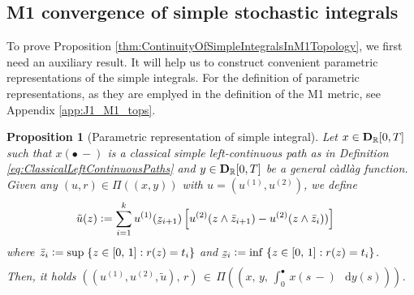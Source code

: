 \documentclass[11pt]{article}
\newtheorem{prop}[theorem]{Proposition}
\theoremstyle{definition}\newtheorem{example}[theorem]{Example}
\theoremstyle{definition}\newtheorem{counterexample}[theorem]{Counterexample}
\theoremstyle{definition}\newtheorem{remark}[theorem]{Remark}
\theoremstyle{definition}\newtheorem{defi}[theorem]{Definition}
\numberwithin{equation}{section}
\newcommand{\ubar}[1]{\underaccent{\bar}{#1}}
\newcommand{\R}{\mathbb{R}}
\newcommand{\D}{{\bf D}}											%
\newcommand*\diff{\mathop{}\!\mathrm{d}}								%
\renewcommand{\sup}[1]{\underset{#1}{\operatorname{sup}}\;}					%
\renewcommand{\inf}[1]{\underset{#1}{\operatorname{inf}}\;}					%
\renewcommand{\|}{\; : \, \;}											%
\begin{document}
\subsection{M1 convergence of simple stochastic integrals}\label{sec:6.5}


To prove Proposition \ref{thm:ContinuityOfSimpleIntegralsInM1Topology}, we first need an auxiliary result. It will help us to construct convenient parametric representations of the simple integrals. For the definition of parametric representations, as they are emplyed in the definition of the M1 metric, see Appendix \ref{app:J1_M1_tops}.

\begin{prop}[Parametric representation of simple integral] \label{prop:ParameterisationOfSimpleIntegrals} 
	Let $x \in \D_\R[0,T]$ such that $x(\bullet \,-)$ is a classical simple left-continuous path as in Definition \ref{eq:ClassicalLeftContinuousPaths} and $y \in \D_\R[0,T]$ be a general càdlàg function. Given any $(u,r) \in \Pi\left((x,y)\right)$ with $u=(u^{(1)}, u^{(2)})$, we define 
	\begin{align*}
		\tilde{u}(z) &\vcentcolon= \sum_{i=1}^k u^{(1)}(\ubar{z}_{i+1})  \left[u^{(2)}(z \wedge \bar{z}_{i+1}) - u^{(2)}(z \wedge \bar{z}_{i}))\right]
	\end{align*}
	where $\bar{z}_i \vcentcolon= \sup{} \{z \in [0,\,1] : r(z) = t_i\}$ and $\ubar{z}_i \vcentcolon= \inf{} \{z \in [0,\,1] : r(z) = t_i\}$.\\
	Then, it holds $\left((u^{(1)},u^{(2)}, \tilde{u}),\, r\right) \, \in \, \Pi\left((x, \,y, \, \int_0^\bullet \, x(s \, -) \, \diff y(s))\right)$.
\end{prop}
\end{document}
